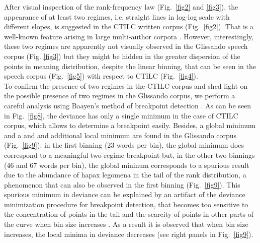 \documentclass[10pt,letterpaper]{article}
\newif\ifarxiv
\begin{document}
After visual inspection of the rank-frequency law (Fig.~\ref{fig2} and \ref{fig3}), the appearance of at least two regimes, i.e. straight lines in log-log scale with different slopes, is suggested in the CTILC written corpus (Fig.~\ref{fig2}). That is a well-known feature arising in large multi-author corpora \cite{ferrer2001two,MONTEMURRO2001, Williams2015, petersen2012languages, montemurro2002new, GerlachAltmann2013}. However, interestingly, these two regimes  are apparently not visually observed in the Glissando speech corpus  (Fig. \ref{fig3}) but they might be hidden in the greater dispersion of the points in meaning distribution, despite the linear binning, that can be seen in the speech corpus (Fig.~\ref{fig5}) with respect to CTILC (Fig.~\ref{fig4}).\\  

To confirm the presence of two regimes in the CTILC corpus and shed light on the possible presence of two regimes in the Glissando corpus, we perform a careful analysis using Baayen's method of breakpoint detection \cite{baayen2008ald}. 
As can be seen in Fig.~\ref{fig8}, 
the deviance has only a single minimum in the case of CTILC corpus,
which allows to determine a breakpoint easily.
Besides, a global minimum and a and and additional local minimum are found in the Glissando corpus (Fig.~\ref{fig9}): in the first binning (23 words per bin), the global minimum does correspond to a meaningful two-regime breakpoint but, in the other two binnings (46 and 67 words per bin), the global mininum corresponds to a spurious result due to the abundance of hapax legomena in the tail of the rank distribution, a phenomenon that can also be observed in the first binning (Fig.~\ref{fig9}). This spurious minimum in deviance can be explained by an artifact of the deviance minimization procedure for breakpoint detection, that becomes too sensitive to the concentration of points in the tail and the scarcity of points in other parts of the curve when bin size increases \cite{baayen2008ald}. As a result it is observed that when bin size increases, the local minima in deviance decreases (see right panels in Fig.~\ref{fig9}).

\ifarxiv
\newpage\vspace*{-1.55cm}
\fi
\end{document}
